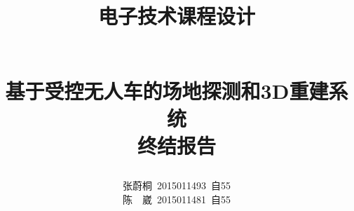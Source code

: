 \documentclass[a4paper]{paper}
\title{
    \begin{large}电子技术课程设计\end{large}\\
    基于受控无人车的场地探测和3D重建系统\\
    终结报告
}
\author{
    张蔚桐\ 2015011493\ 自55\\
    陈　崴\ 2015011481\ 自55
}
\begin{document}
\newcommand{\tabincell}[2]{\begin{tabular}{@{}#1@{}}#2\end{tabular}}
\maketitle
\tableofcontents    
\clearpage
\end{document}
